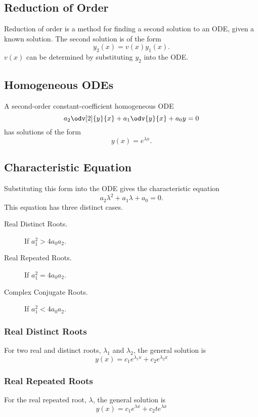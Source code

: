 \documentclass{article}
\begin{document}
\subsection{Reduction of Order}
Reduction of order is a method for finding a second solution to an ODE,
given a known solution. The second solution is of the form
\begin{equation*}
    y_2\left( x \right) = v\left(x\right) y_1\left( x \right).
\end{equation*}
\(v\left( x \right)\) can be determined by substituting \(y_2\) into the ODE\@.
\subsection{Homogeneous ODEs}
A second-order constant-coefficient homogeneous ODE
\begin{equation*}
    a_2\odv[2]{y}{x} + a_1\odv{y}{x} + a_0y = 0
\end{equation*}
has solutions of the form
\begin{equation*}
    y\left( x \right) = e^{\lambda x}.
\end{equation*}
\subsection{Characteristic Equation}
Substituting this form into the ODE gives the characteristic equation
\begin{equation*}
    a_2\lambda^2 + a_1\lambda + a_0 = 0.
\end{equation*}
This equation has three distinct cases.
\begin{description}
    \item[Real Distinct Roots.] If \(a_1^2 > 4a_0a_2\).
    \item[Real Repeated Roots.] If \(a_1^2 = 4a_0a_2\).
    \item[Complex Conjugate Roots.] If \(a_1^2 < 4a_0a_2\).
\end{description}
\subsubsection{Real Distinct Roots}
For two real and distinct roots, \(\lambda_1\) and \(\lambda_2\), the
general solution is
\begin{equation*}
    y\left( x \right) = c_1e^{\lambda_1 x} + c_2e^{\lambda_2 x}
\end{equation*}
\subsubsection{Real Repeated Roots}
For the real repeated root, \(\lambda\), the general solution is
\begin{equation*}
    y\left( x \right) = c_1e^{\lambda x} + c_2 te^{\lambda x}
\end{equation*}
\end{document}
